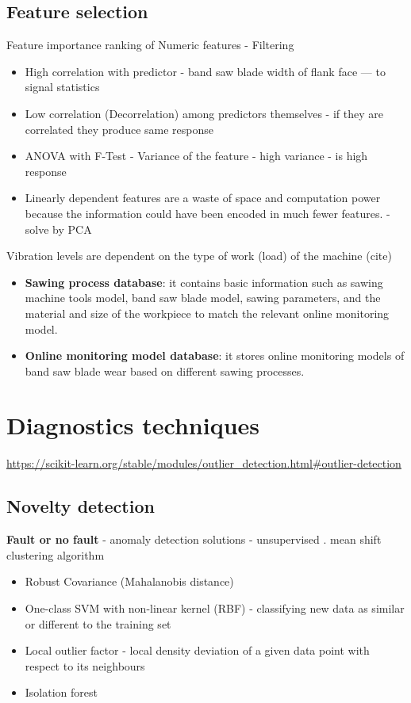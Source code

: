 \subsection{Feature selection}
Feature importance ranking of Numeric features - Filtering
\begin{itemize}
\item High correlation with predictor - band saw blade width of flank face --- to signal statistics
\item Low correlation (Decorrelation) among predictors themselves - if they are correlated they produce same response
\item ANOVA with F-Test - Variance of the feature - high variance - is high response
\item Linearly dependent features are a waste of space and computation power because the information could have been encoded in much fewer features. \cite{zheng_feature_2018} - solve by PCA
\end{itemize}

Vibration levels are dependent on the type of work (load) of the machine (cite)
\begin{itemize}
\item \textbf{Sawing process database}: it contains basic information such as sawing machine tools model, band saw blade model, sawing parameters, and the material and size of the workpiece to match the relevant online monitoring model.
\item \textbf{Online monitoring model database}: it stores online monitoring models of band saw blade wear based on different sawing processes.
\end{itemize}

\section{Diagnostics techniques}
\url{https://scikit-learn.org/stable/modules/outlier_detection.html#outlier-detection}
\subsection{Novelty detection}
\textbf{Fault or no fault} - anomaly detection solutions - unsupervised \cite{torres_automatic_2022}. mean shift clustering algorithm
\begin{itemize}
\item Robust Covariance  (Mahalanobis distance)
\item One-class SVM with non-linear kernel (RBF) - classifying new data as similar or different to the training set
\item Local outlier factor - local density deviation of a given data point with respect to its neighbours
\item Isolation forest
\end{itemize}

